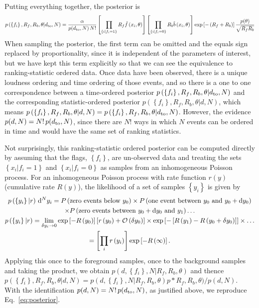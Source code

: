 \documentclass[aps,prd]{revtex4-1}
\newcommand{\order}[1]{\mathcal{O}\left( #1 \right)}
\newcommand{\mathset}[1]{\left\{ #1 \right\}}
\begin{document}
Putting everything together, the posterior is
\begin{equation}
  \label{eq:posterior}
  p\left( \mathset{f_i}, R_f, R_b, \theta | d_{\rm to},N \right) = \frac{\alpha}{p(d_{\rm to},N)\,N!} \left[
    \prod_{\mathset{i | f_i = 1}} R_f \hat{f}\left(x_i, \theta\right) \right]
  \left[ \prod_{\mathset{i | f_i = 0}} R_b \hat{b}\left( x_i, \theta\right)
  \right] \exp\left[ - \left(R_f + R_b\right) \right]
  \frac{p(\theta)}{\sqrt{R_f R_b}}
\end{equation}
When sampling the posterior, the first term can be omitted and the equals sign replaced by proportionality, since it is independent of the parameters of interest, but we have kept this term explicitly so that we can see the equivalence to ranking-statistic ordered data. Once data have been observed, there is a unique loudness ordering and time ordering of those events, and so there is a one to one correspondence between a time-ordered posterior $p\left( \mathset{f_i}, R_f, R_b, \theta | d_{\rm to},N \right)$ and the corresponding statistic-ordered posterior $ p\left( \mathset{f_i}, R_f, R_b, \theta | d,N \right)$, which means $p\left( \mathset{f_i}, R_f, R_b, \theta | d,N \right) = p\left( \mathset{f_i}, R_f, R_b, \theta | d_{\rm to},N \right)$. However, the evidence $p(d,N) = N!\,p(d_{\rm to},N)$, since there are $N!$ ways in which $N$ events can be ordered in time and would have the same set of ranking statistics.

Not surprisingly, this ranking-statistic ordered posterior can be computed directly by
assuming that the flags, $\mathset{f_i}$, are un-observed data and
treating the sets $\mathset{x_i | f_i = 1}$ and $\mathset{x_i | f_i =
  0}$ as samples from an inhomogeneous Poisson process.  For an
inhomogeneous Poisson process with rate function $r(y)$ (cumulative
rate $R(y)$), the likelihood of a set of samples $\mathset{y_i}$ is
given by 
\begin{multline}
  p\left( \mathset{y_i} | r \right) \,{\rm d}^Ny_i= P\left(
  \textnormal{zero events below } y_0  \right) \times
  P\left( \textnormal{one event between } y_0  \textnormal{
    and } y_0 + {\rm d}y_0 \right) \\ \times P\left( \textnormal{zero
    events between } y_0+{\rm d}y_0 \textnormal{ and } y_1
  \right) \ldots \\ p\left( \mathset{y_i} | r \right) = \lim_{\delta y_i \to 0} \exp\left[ - R\left(y_0\right) \right] \left[ r\left( y_0 \right) +
    \order{\delta y_0} \right] \times \exp\left[ - \left[ R\left( y_1
      \right) - R\left( y_0 + \delta y_0\right) \right]
    \right] \times \ldots \\ = \left[\prod_i r\left( y_i
    \right)\right] \exp\left[ - R\left( \infty \right) \right].
\end{multline}
Applying this once to the foreground samples, once to
the background samples and taking the product, we obtain $p(d,\mathset{f_i}, N | R_f, R_b, \theta)$ and thence $p(\mathset{f_i}, R_f, R_b, \theta | d,N) = p(d,\mathset{f_i}, N | R_f, R_b, \theta) p*R_f, R_b, \theta)/p(d,N)$. With the identification $p(d,N) = N!\,p(d_{\rm to},N)$, as justified above, we reproduce Eq.~\eqref{eq:posterior}.
\end{document}
